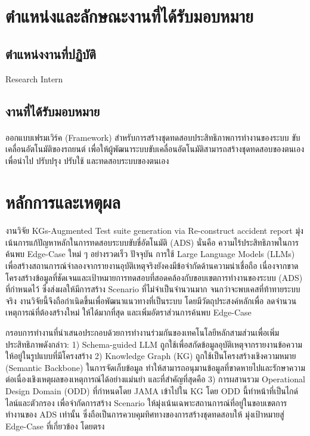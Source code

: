\section{ตำแหน่งและลักษณะงานที่ได้รับมอบหมาย}\label{sec:job-details}

\subsection{ตำแหน่งงานที่ปฏิบัติ}\label{subsec:job-position}
Research Intern
\subsection{งานที่ได้รับมอบหมาย}\label{subsec:assigned-tasks}

\paragraph{}ออกแบบเฟรมเวิร์ค
(Framework)
สำหรับการสร้างชุดทดสอบประสิทธิภาพการทำงานของระบบ
ขับเคลื่อนอัตโนมัติของรถยนต์
เพื่อให้ผู้พัฒนาระบบขับเคลื่อนอัตโนมัติสามารถสร้างชุดทดสอบของตนเอง เพื่อนำไป
ปรับปรุง ปรับใช้ และทดสอบระบบของตนเอง

\section{หลักการและเหตุผล}\label{sec:introduction}


\paragraph{}งานวิจัย KGs-Augmented Test suite generation via Re-construct accident report มุ่งเน้นการแก้ปัญหาหลักในการทดสอบระบบขับขี่อัตโนมัติ (ADS) นั่นคือ ความไร้ประสิทธิภาพในการค้นพบ Edge-Case ใหม่ ๆ อย่างรวดเร็ว ปัจจุบัน การใช้ Large Language Models (LLMs) เพื่อสร้างสถานการณ์จำลองจากรายงานอุบัติเหตุจริงยังคงมีข้อจำกัดด้านความน่าเชื่อถือ เนื่องจากขาดโครงสร้างข้อมูลที่ชัดเจนและเป้าหมายการทดสอบที่สอดคล้องกับขอบเขตการทำงานของระบบ (ADS) ที่กำหนดไว้ ซึ่งส่งผลให้มีการสร้าง Scenario ที่ไม่จำเป็นจำนวนมาก จนกว่าจะพบเคสที่ท้าทายระบบจริง งานวิจัยนี้จึงถือกำเนิดขึ้นเพื่อพัฒนาแนวทางที่เป็นระบบ โดยมีวัตถุประสงค์หลักเพื่อ ลดจำนวนเหตุการณ์ที่ต้องสร้างใหม่ ให้ได้มากที่สุด และเพิ่มอัตราส่วนการค้นพบ Edge-Case

กรอบการทำงานที่นำเสนอประกอบด้วยการทำงานร่วมกันของเทคโนโลยีหลักสามส่วนเพื่อเพิ่มประสิทธิภาพดังกล่าว: 1) Schema-guided LLM ถูกใช้เพื่อสกัดข้อมูลอุบัติเหตุจากรายงานข้อความให้อยู่ในรูปแบบที่มีโครงสร้าง 2) Knowledge Graph (KG) ถูกใช้เป็นโครงสร้างเชิงความหมาย (Semantic Backbone) ในการจัดเก็บข้อมูล ทำให้สามารถอนุมานข้อมูลที่ขาดหายไปและรักษาความต่อเนื่องเชิงเหตุผลของเหตุการณ์ได้อย่างแม่นยำ และที่สำคัญที่สุดคือ 3) การผสานรวม Operational Design Domain (ODD) ที่กำหนดโดย JAMA เข้าไปใน KG โดย ODD นี้ทำหน้าที่เป็นไกด์ไลน์และตัวกรอง เพื่อจำกัดการสร้าง Scenario ให้มุ่งเน้นเฉพาะสถานการณ์ที่อยู่ในขอบเขตการทำงานของ ADS เท่านั้น ซึ่งถือเป็นการควบคุมทิศทางของการสร้างชุดทดสอบให้ มุ่งเป้าหมายสู่ Edge-Case ที่เกี่ยวข้อง โดยตรง

